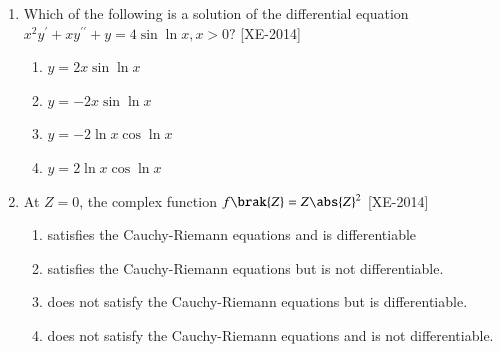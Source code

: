 \documentclass[journal]{IEEEtran}
\begin{document}
\begin{enumerate}
\item Which of the following is a solution of the differential equation\\ $x^2y^\prime + xy^{\prime\prime}+ y = 4\sin{\ln{x},x>0?}$ \hfill{[XE-2014]}
\begin{enumerate}
    \item $y = 2x\sin{\ln{x}}$
    \item $y = -2x\sin{\ln{x}}$
    \item $y = -2\ln{x}\cos{\ln{x}}$
    \item $y = 2\ln{x}\cos{\ln{x}}$
\end{enumerate}
\item At $Z = 0$, the complex function $f\brak{Z} = Z\abs{Z}^2$ \hfill{[XE-2014]}
\begin{enumerate}
    \item satisfies the Cauchy-Riemann equations and is differentiable
    \item satisfies the Cauchy-Riemann equations but is not differentiable.
    \item does not satisfy the Cauchy-Riemann equations but is differentiable.
    \item does not satisfy the Cauchy-Riemann equations and is not differentiable.
\end{enumerate}
    \end{enumerate}
\end{document}
